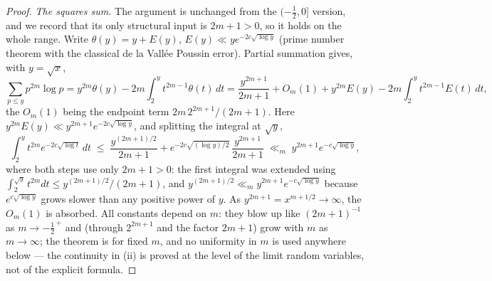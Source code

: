 \begin{proof}
\emph{The squares sum.} The argument is unchanged from the
$(-\tfrac12,0]$ version, and we record that its only structural input
is $2m+1>0$, so it holds on the whole range. Write
$\theta(y)=y+E(y)$, $E(y)\ll ye^{-2c\sqrt{\log y}}$ (prime number
theorem with the classical de la Vall\'ee Poussin error). Partial
summation gives, with $y=\sqrt x$,
\[
\sum_{p\le y}p^{2m}\log p
=y^{2m}\theta(y)-2m\int_2^y t^{2m-1}\theta(t)\,dt
=\frac{y^{2m+1}}{2m+1}+O_m(1)
+y^{2m}E(y)-2m\int_2^y t^{2m-1}E(t)\,dt ,
\]
the $O_m(1)$ being the endpoint term
$2m\,2^{2m+1}/(2m+1)$. Here $y^{2m}E(y)\ll y^{2m+1}e^{-2c\sqrt{\log y}}$,
and splitting the integral at $\sqrt y$,
\[
\int_2^y t^{2m}e^{-2c\sqrt{\log t}}\,dt
\;\le\;\frac{y^{(2m+1)/2}}{2m+1}
+e^{-2c\sqrt{(\log y)/2}}\,\frac{y^{2m+1}}{2m+1}
\;\ll_m\; y^{2m+1}e^{-c\sqrt{\log y}} ,
\]
where both steps use only $2m+1>0$: the first integral was extended
using $\int_2^{\sqrt y}t^{2m}dt\le y^{(2m+1)/2}/(2m+1)$, and
$y^{(2m+1)/2}\ll_m y^{2m+1}e^{-c\sqrt{\log y}}$ because
$e^{c\sqrt{\log y}}$ grows slower than any positive power of $y$. As
$y^{2m+1}=x^{m+1/2}\to\infty$, the $O_m(1)$ is absorbed. All constants
depend on $m$: they blow up like $(2m+1)^{-1}$ as $m\to-\tfrac12^{\,+}$
and (through $2^{2m+1}$ and the factor $2m+1$) grow with $m$ as
$m\to\infty$; the theorem is for fixed $m$, and no uniformity in $m$ is
used anywhere below --- the continuity in (ii) is proved at the level
of the limit random variables, not of the explicit formula.
\end{proof}



